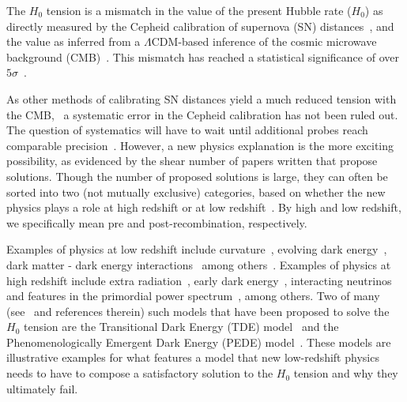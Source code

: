 \documentclass[
 reprint,
 amsmath,amssymb,
 aps,
]{revtex4-2}
\begin{document}
The $H_0$ tension is a mismatch in the value of the present Hubble rate ($H_0$) as directly measured by the Cepheid calibration of supernova (SN) distances~\cite{Riess:2016jrr,Riess:2019cxk,Riess:2020fzl}, and the value as inferred from a $\Lambda$CDM-based inference of the cosmic microwave background (CMB)~\cite{Planck:2018vyg}.  This mismatch has reached a statistical significance of over $5\sigma$~\cite{Riess:2021jrx}.  

As other methods of calibrating SN distances yield a much reduced tension with the CMB,~\cite{Freedman:2019jwv} a systematic error in the Cepheid calibration has not been ruled out. The question of systematics will have to wait until additional probes reach comparable precision~\cite{Birrer:2020tax,LIGOScientific:2017adf,LIGOScientific:2019zcs}. However, a new physics explanation is the more exciting possibility, as evidenced by the shear number of papers written that propose solutions. Though the number of proposed solutions is large, they can often be sorted into two (not mutually exclusive) categories, based on whether the new physics plays a role at high redshift or at low redshift~\cite{Linder:2021ujs,Abdalla:2022yfr}. By high and low redshift, we specifically mean pre and post-recombination, respectively.

Examples of physics at low redshift include curvature~\cite{Ryan:2019uor,DiValentino:2019qzk}, evolving dark energy~\cite{2018PhRvD..97l3501J,2019JCAP...12..035K,Li:2019yem,2020PhRvD.101j3517B}, dark matter - dark energy interactions~\cite{DiValentino:2020kpf} among others~\cite{DiValentino:2020kha}. Examples of physics at high redshift include extra radiation~\cite{2016JCAP...10..019B}, early dark energy~\cite{Poulin:2018cxd,Sakstein:2019fmf,Hill:2020osr}, interacting neutrinos~\cite{Kreisch:2019yzn,Park:2019ibn} and features in the primordial power spectrum~\cite{Hazra:2018opk,2020JCAP...09..055K,Hazra:2022rdl,Antony:2022ert}, among others. Two of many (see~\cite{Schoneberg:2021qvd,Abdalla:2022yfr} and references therein) such models that have been proposed to solve the $H_0$ tension are the Transitional Dark Energy (TDE) model~\cite{2019JCAP...12..035K} and the Phenomenologically Emergent Dark Energy (PEDE) model~\cite{Li:2019yem}. These models are illustrative examples for what features a model that new low-redshift physics needs to have to compose a satisfactory solution to the $H_0$ tension and why they ultimately fail.
\end{document}
